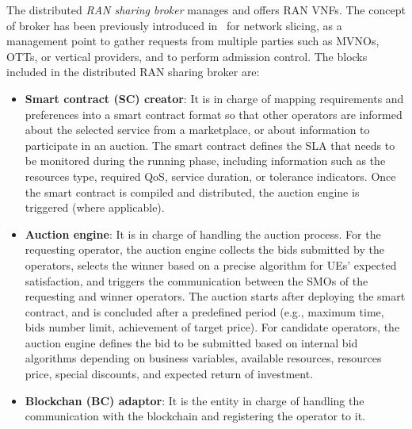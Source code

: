 \documentclass[journal]{IEEEtran}
\begin{document}
	The distributed \textit{RAN sharing broker} manages and offers RAN VNFs. The concept of broker has been previously introduced in~\cite{samdanis2016network} for network slicing, as a management point to gather requests from multiple parties such as MVNOs, OTTs, or vertical providers, and to perform admission control. The blocks included in the distributed RAN sharing broker are:
	\begin{itemize}
		\item \textbf{Smart contract (SC) creator}: It is in charge of mapping requirements and preferences into a smart contract format so that other operators are informed about the selected service from a marketplace, or about information to participate in an auction. The smart contract defines the SLA that needs to be monitored during the running phase, including information such as the resources type, required QoS, service duration, or tolerance indicators. Once the smart contract is compiled and distributed, the auction engine is triggered (where applicable).
		\item \textbf{Auction engine}: It is in charge of handling the auction process. For the requesting operator, the auction engine collects the bids submitted by the operators, selects the winner based on a precise algorithm for UEs' expected satisfaction, and triggers the communication between the SMOs of the requesting and winner operators. The auction starts after deploying the smart contract, and is concluded after a predefined period (e.g., maximum time, bids number limit, achievement of target price). For candidate operators, the auction engine defines the bid to be submitted based on internal bid algorithms depending on business variables, available resources, resources price, special discounts, and expected return of investment. %
		\item \textbf{Blockchan (BC) adaptor}: It is the entity in charge of handling the communication with the blockchain and registering the operator to it.
	\end{itemize}
	
\end{document}

